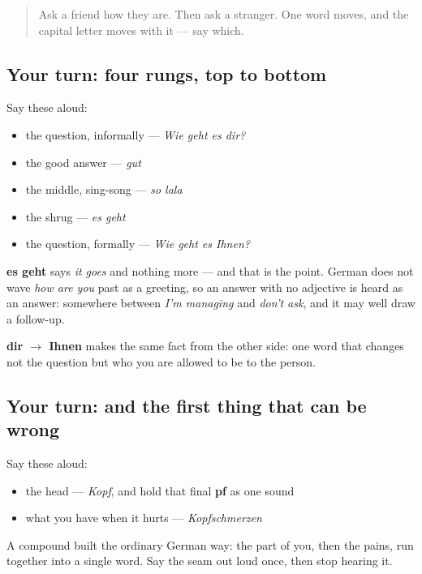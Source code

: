 \label{lesson:GE-R17-wie-geht-es-wirklich}



\begin{quote}
Ask a friend how they are. Then ask a stranger. One word moves, and the capital letter moves with it — say which.
\end{quote}

\subsection*{Your turn: four rungs, top to bottom}
Say these aloud:

\begin{itemize}
\raggedright
  \item the question, informally — \emph{Wie geht es dir?}
  \item the good answer — \emph{gut}
  \item the middle, sing-song — \emph{so lala}
  \item the shrug — \emph{es geht}
  \item the question, formally — \emph{Wie geht es Ihnen?}
\end{itemize}

\begin{culture}
\textbf{es geht} says \emph{it goes} and nothing more — and that is the point. German does not wave \emph{how are you} past as a greeting, so an answer with no adjective is heard as an answer: somewhere between \emph{I'm managing} and \emph{don't ask}, and it may well draw a follow-up.

\textbf{dir $\to$ Ihnen} makes the same fact from the other side: one word that changes not the question but who you are allowed to be to the person.
\end{culture}

\subsection*{Your turn: and the first thing that can be wrong}
Say these aloud:

\begin{itemize}
\raggedright
  \item the head — \emph{Kopf}, and hold that final \textbf{pf} as one sound
  \item what you have when it hurts — \emph{Kopfschmerzen}
\end{itemize}

A compound built the ordinary German way: the part of you, then the pains, run together into a single word. Say the seam out loud once, then stop hearing it.

